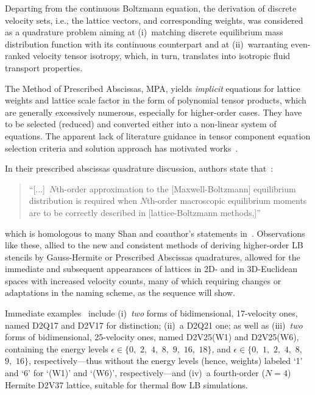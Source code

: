     Departing from the continuous Boltzmann equation, the derivation of discrete velocity sets, i.e., the lattice  vectors,  and
    corresponding weights, was considered as a quadrature problem aiming at (i)~matching discrete equilibrium mass  distribution
    function with its continuous counterpart and at (ii)~warranting  even-ranked  velocity  tensor  isotropy,  which,  in  turn,
    translates into isotropic fluid transport properties.

    The Method of Prescribed Abscissas, MPA, yields \emph{implicit} equations for lattice weights and lattice  scale  factor  in
    the form of polynomial tensor products, which are generally excessively numerous, especially for  higher-order  cases.  They
    have to be selected (reduced) and converted either into a non-linear system of equations. The apparent  lack  of  literature
    guidance   in    tensor    component    equation    selection    criteria    and    solution    approach    has    motivated
    works~\cite{2016-AndradeFN-MEngUTFPR, 2019-daRosaTG-MEngUTFPR}.

    In their prescribed abscissas quadrature discussion, authors state that~\cite[p.~6]{2006-PhilippiPC+SurmasR-PhysRevE}:
    \begin{quote}
        \swshape
        ``[...]~$N$th-order approximation to the [Maxwell-Boltzmann]  equilibrium  distribution  is  required  when  $N$th-order
        macroscopic equilibrium moments are to be correctly described in [lattice-Boltzmann methods,]''
    \end{quote}
    \noindent which is homologous to many Shan and  coauthor's  statements  in~\cite{2006-ShanX+ChenH-JFluidMech}.  Observations
    like these, allied to the new and consistent methods of deriving higher-order LB stencils  by  Gauss-Hermite  or  Prescribed
    Abscissas quadratures, allowed for the immediate and subsequent appearances of lattices in 2D- and  in  3D-Euclidean  spaces
    with increased velocity counts, many of which requiring changes or adaptations in the naming scheme, as  the  sequence  will
    show.

    Immediate examples~\cite{2006-PhilippiPC+SurmasR-PhysRevE} include (i)~\emph{two} forms of bidimensional, 17-velocity  ones,
    named D2Q17 and D2V17 for distinction; (ii)~a D2Q21 one; as well as (iii)~\emph{two}  forms  of  bidimensional,  25-velocity
    ones, named D2V25(W1) and D2V25(W6), containing the energy levels $\epsilon \in \{0,$ $2,$ $4,$ $8,$ $9,$ $16,$ $18\}$,  and
    $\epsilon \in \{0,$ $1,$ $2,$ $4,$ $8,$ $9,$ $16\}$, respectively---thus without the energy levels (hence, weights)  labeled
    `1' and `6' for `(W1)' and `(W6)', respectively---and (iv)~a  fourth-order  ($N=4$)  Hermite  D2V37  lattice,  suitable  for
    thermal flow LB simulations.


